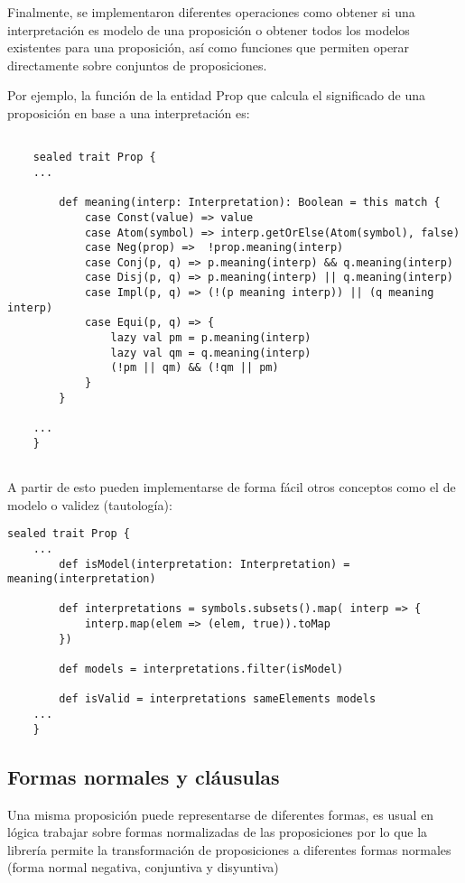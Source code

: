 	Finalmente, se implementaron diferentes operaciones como obtener si una interpretación es modelo de una proposición o obtener todos los modelos existentes para una proposición, así como funciones que permiten operar directamente sobre conjuntos de proposiciones.
	
	Por ejemplo, la función de la entidad Prop que calcula el significado de una proposición en base a una interpretación es:
	
	\begin{lstlisting}[style=myScalastyle]
	
	sealed trait Prop {
	...
	
		def meaning(interp: Interpretation): Boolean = this match {
			case Const(value) => value
			case Atom(symbol) => interp.getOrElse(Atom(symbol), false)
			case Neg(prop) =>  !prop.meaning(interp)
			case Conj(p, q) => p.meaning(interp) && q.meaning(interp)
			case Disj(p, q) => p.meaning(interp) || q.meaning(interp)
			case Impl(p, q) => (!(p meaning interp)) || (q meaning interp)
			case Equi(p, q) => {
				lazy val pm = p.meaning(interp)
				lazy val qm = q.meaning(interp)
				(!pm || qm) && (!qm || pm)
			}
		}
		
	...
	}
	
	\end{lstlisting}
	
	A partir de esto pueden implementarse de forma fácil otros conceptos como el de modelo o validez (tautología):
	
	\begin{lstlisting}[style=myScalastyle]
	sealed trait Prop {
	...
		def isModel(interpretation: Interpretation) = meaning(interpretation)
	
		def interpretations = symbols.subsets().map( interp => {
			interp.map(elem => (elem, true)).toMap
		})
		
		def models = interpretations.filter(isModel)
		
		def isValid = interpretations sameElements models
	...
	}
	\end{lstlisting}	
	
\subsection*{Formas normales y cláusulas}

	Una misma proposición puede representarse de diferentes formas, es usual en lógica trabajar sobre formas normalizadas de las proposiciones por lo que la librería permite la transformación de proposiciones a diferentes formas normales (forma normal negativa, conjuntiva y disyuntiva)	
	
